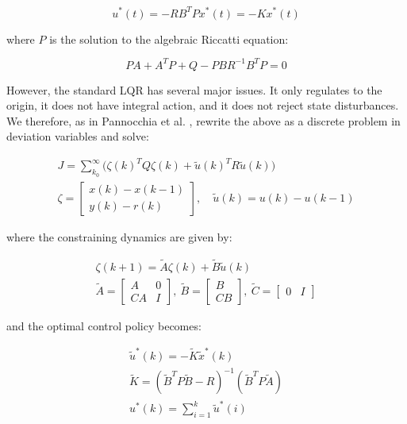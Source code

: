 \begin{equation}\label{eq:LQRSolution}
	u^*(t) = -RB^TPx^*(t) = -Kx^*(t)
\end{equation}

where $P$ is the solution to the algebraic Riccatti equation:

\begin{equation}\label{eq:ARE}
	PA + A^TP + Q - PBR^{-1}B^TP = 0
\end{equation}

However, the standard LQR has several major issues. It only regulates to the origin, it does not have integral action, and it does not reject state disturbances. We therefore, as in Pannocchia et al. \cite{Pannocchia2015a}, rewrite the above as a discrete problem in deviation variables and solve:

\begin{equation}\label{eq:LagrangeProblemDeviation}
	\begin{gathered}
	J = \sum_{k_0}^{\infty} \big(\zeta(k)^TQ\zeta(k) + \tilde{u}(k)^TR\tilde{u}(k)\big) \\
	\zeta = \begin{bmatrix}	x(k)-x(k-1) \\ y(k)-r(k) \end{bmatrix}, \quad \tilde{u}(k) = u(k)-u(k-1) 
	\end{gathered}
\end{equation} 

where the constraining dynamics are given by:

\begin{equation}\label{eq:VelocityMatrices}
	\begin{gathered}
		\zeta(k+1) = \tilde{A}\zeta(k) + \tilde{B}\tilde{u}(k) \\
		\tilde{A} = \begin{bmatrix} A & 0 \\ CA & I	\end{bmatrix}, \ 
		\tilde{B} = \begin{bmatrix} B \\ CB	\end{bmatrix}, \ \tilde{C} = \begin{bmatrix} 0 & I	\end{bmatrix}
	\end{gathered}
\end{equation}

and the optimal control policy becomes:

\begin{equation}\label{eq:OptimalVFLQRPolicy}
\begin{gathered}
\tilde{u}^*(k)  = -\tilde{K}\tilde{x}^*(k) \\
\tilde{K} = (\tilde{B}^TP\tilde{B}-R)^{-1}(\tilde{B}^TP\tilde{A}) \\
u^*(k) = \sum_{i=1}^{k} \tilde{u}^*(i)
\end{gathered}
\end{equation}

